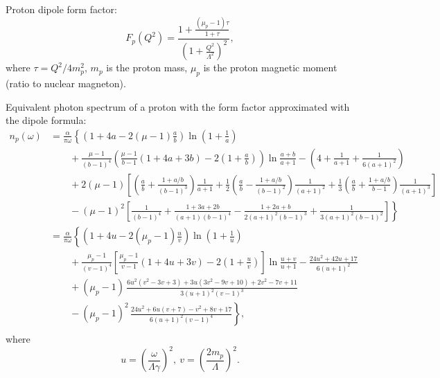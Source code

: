 \documentclass[a4paper,12pt]{article}
\begin{document}
Proton dipole form factor:
\begin{equation}
  F_p(Q^2)
  = \frac{1 + \frac{(\mu_p - 1) \tau}{1 + \tau}}
         {\left( 1 + \frac{Q^2}{\Lambda^2} \right)^2},
\end{equation}
where $\tau = Q^2 / 4 m_p^2$, $m_p$ is the proton mass, $\mu_p$ is the proton
magnetic moment (ratio to nuclear magneton).

Equivalent photon spectrum of a proton with the form factor approximated with
the dipole formula:
\begin{equation}
  \begin{split}
    n_p(\omega)
   &= \frac{\alpha}{\pi \omega}
      \left\{
          \left( 1 + 4 a - 2 (\mu - 1) \frac{a}{b} \right)
          \ln\left( 1 + \frac{1}{a} \right)
   \right. \\ &\qquad \left. {}
        + \frac{\mu - 1}{(b - 1)^4}
          \left(
            \frac{\mu - 1}{b - 1} (1 + 4 a + 3 b) - 2 \left( 1 + \frac{a}{b} \right)
          \right)
          \ln \frac{a + b}{a + 1}
        - \left( 4 + \frac{1}{a + 1} + \frac{1}{6 (a + 1)^2} \right)
   \right. \\ &\qquad \left. {}
        + 2 (\mu - 1) \left[
              \left( \frac{a}{b} + \frac{1 + a/b}{(b - 1)^3} \right)
              \frac{1}{a + 1}
            + \frac12
              \left( \frac{a}{b} - \frac{1 + a/b}{(b - 1)^2} \right)
              \frac{1}{(a + 1)^2}
            + \frac13
              \left( \frac{a}{b} + \frac{1 + a/b}{b - 1} \right)
              \frac{1}{(a + 1)^3}
         \right]
   \right. \\ &\qquad \left. {}
       - (\mu - 1)^2
         \left[
           \frac{1}{(b - 1)^4}
           + \frac{1 + 3 a + 2 b}{(a + 1) (b - 1)^4}
           - \frac{1 + 2 a + b}{2 (a + 1)^2 (b - 1)^3}
           + \frac{1}{3 (a + 1)^2 (b - 1)^2}
         \right]
     \right\}
    \\
    &= \frac{\alpha}{\pi \omega}
       \left\{
           \left( 1 + 4 u - 2 (\mu_p - 1) \frac{u}{v} \right)
           \ln \left( 1 + \frac{1}{u} \right)
    \right. \\ &\qquad \left. {}
         + \frac{\mu_p - 1}{(v - 1)^4} \left[
               \frac{\mu_p - 1}{v - 1} (1 + 4 u + 3 v)
             - 2 \left( 1 + \frac{u}{v} \right)
           \right]
           \ln \frac{u + v}{u + 1}
         - \frac{24 u^2 + 42 u + 17}{6 (u + 1)^2}
    \right. \\ &\qquad \left. {}
         + (\mu_p - 1) \,
           \frac{
             6 u^2 (v^2 - 3 v + 3) + 3 u (3 v^2 - 9 v + 10) + 2 v^2 - 7 v + 11
           }{
             3 (u + 1)^2 (v - 1)^3
           }
    \right. \\ &\qquad \left. {}
         - (\mu_p - 1)^2 \,
           \frac{
             24 u^2 + 6 u (v + 7) - v^2 + 8 v + 17
           }{
             6 (u + 1)^2 (v - 1)^4
           }
       \right\},
    \\
  \end{split}
\end{equation}
where
\begin{equation}
  u = \left( \frac{\omega}{\Lambda \gamma} \right)^2, \ 
  v = \left( \frac{2 m_p}{\Lambda} \right)^2.
\end{equation}
\end{document}
